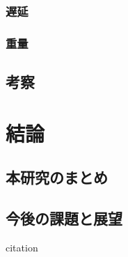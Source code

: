 \subsection{遅延}
\subsection{重量}
\section{考察}

\chapter{結論}
\section{本研究のまとめ}
\section{今後の課題と展望}

citation\cite{hoge09}
